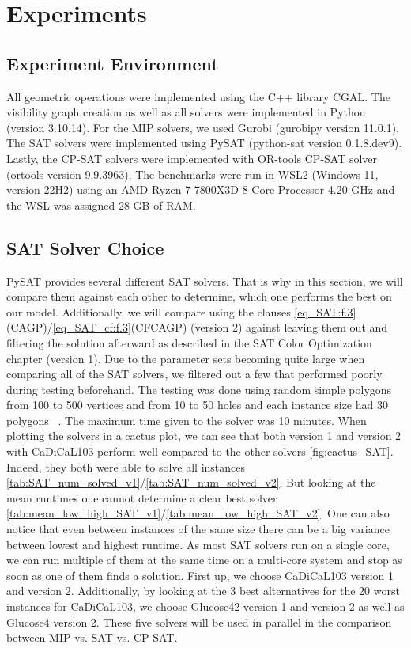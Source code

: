\chapter{Experiments}
\section{Experiment Environment}
All geometric operations were implemented using the C++ library CGAL. The visibility graph creation as well as all solvers were implemented in Python (version 3.10.14). For the MIP solvers, we used Gurobi (gurobipy version 11.0.1). The SAT solvers were implemented using PySAT (python-sat version 0.1.8.dev9). Lastly, the CP-SAT solvers were implemented with OR-tools CP-SAT solver (ortools version 9.9.3963).
The benchmarks were run in WSL2 (Windows 11, version 22H2) using an AMD Ryzen 7 7800X3D 8-Core Processor 4.20 GHz and the WSL was assigned 28 GB of RAM.

\section{SAT Solver Choice}
PySAT provides several different SAT solvers. That is why in this section, we will compare them against each other to determine, which one performs the best on our model. Additionally, we will compare using the clauses \cref{eq_SAT:f.3}(CAGP)/\cref{eq_SAT_cf:f.3}(CFCAGP) (version 2) against leaving them out and filtering the solution afterward as described in the SAT Color Optimization chapter (version 1). Due to the parameter sets becoming quite large when comparing all of the SAT solvers, we filtered out a few that performed poorly during testing beforehand. The testing was done using random simple polygons from 100 to 500 vertices and from 10 to 50 holes and each instance size had 30 polygons ~\cite{art-gallery-unicamp-page}. The maximum time given to the solver was 10 minutes. When plotting the solvers in a cactus plot, we can see that both version 1 and version 2 with CaDiCaL103 perform well compared to the other solvers \cref{fig:cactus_SAT}. Indeed, they both were able to solve all instances \cref{tab:SAT_num_solved_v1}/\cref{tab:SAT_num_solved_v2}. But looking at the mean runtimes one cannot determine a clear best solver \cref{tab:mean_low_high_SAT_v1}/\cref{tab:mean_low_high_SAT_v2}. One can also notice that even between instances of the same size there can be a big variance between lowest and highest runtime. As most SAT solvers run on a single core, we can run multiple of them at the same time on a multi-core system and stop as soon as one of them finds a solution. First up, we choose CaDiCaL103 version 1 and version 2. Additionally, by looking at the 3 best alternatives for the 20 worst instances for CaDiCaL103, we choose Glucose42 version 1 and version 2 as well as Glucose4 version 2. These five solvers will be used in parallel in the comparison between MIP vs. SAT vs. CP-SAT.

